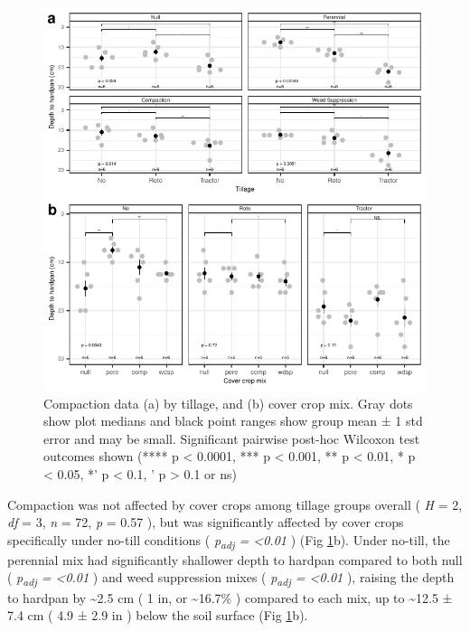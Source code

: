 \documentclass[
  12pt,
]{article}
\begin{document}
\begin{figure}
\centering
\includegraphics{merge_files/figure-latex/compactFig-1.pdf}
\caption{\label{fig:compactFig}Compaction data (a) by tillage, and (b) cover crop mix. Gray dots show plot medians and black point ranges show group mean ± 1 std error and may be small. Significant pairwise post-hoc Wilcoxon test outcomes shown (**** p \textless{} 0.0001, *** p \textless{} 0.001, ** p \textless{} 0.01, * p \textless{} 0.05, *' p \textless{} 0.1, ' p \textgreater{} 0.1 or ns)}
\end{figure}

Compaction was not affected by cover crops among tillage groups overall (
\emph{H} = 2,
\emph{df} = 3,
\emph{n} = 72,
\emph{p} = 0.57
), but was significantly affected by cover crops specifically under no-till conditions (
\emph{p\textsubscript{adj} = \textless0.01}
) (Fig \ref{fig:compactFig}b).
Under no-till, the perennial mix had significantly shallower depth to hardpan compared to both null (
\emph{p\textsubscript{adj} = \textless0.01}
) and weed suppression mixes (
\emph{p\textsubscript{adj} = \textless0.01}
),
raising the depth to hardpan by
\textasciitilde2.5 cm (
1 in,
or \textasciitilde16.7\%
) compared to each mix,
up to
\textasciitilde12.5 ±
7.4 cm
(
4.9 ±
2.9 in
) below the soil surface
(Fig \ref{fig:compactFig}b).
\end{document}
